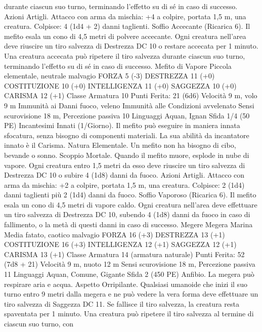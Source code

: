 \begin{multicols}{2}
durante ciascun suo turno, terminando l’effetto su di sé in caso di
successo.
Azioni
Artigli. Attacco con arma da mischia: +4 a colpire, portata 1,5
m, una creatura.
Colpisce: 4 (1d4 + 2) danni taglienti.
Soffio Accecante (Ricarica 6). Il mefito esala un cono di 4,5
metri di polvere accecante. Ogni creatura nell’area deve riuscire
un tiro salvezza di Destrezza DC 10 o restare accecata per 1
minuto. Una creatura accecata può ripetere il tiro salvezza
durante ciascun suo turno, terminando l’effetto su di sé in caso di
successo.
Mefito di Vapore
Piccola elementale, neutrale malvagio
FORZA 5 (-3)
DESTREZZA 11 (+0)
COSTITUZIONE 10 (+0)
INTELLIGENZA 11 (+0)
SAGGEZZA 10 (+0)
CARISMA 12 (+1)
Classe Armatura 10
\hspace*{0pt}\hfill{Punti Ferita}: 21 (6d6)
Velocità 9 m, volo 9 m
Immunità ai Danni fuoco, veleno
Immunità alle Condizioni avvelenato
Sensi scurovisione 18 m, Percezione passiva 10
Linguaggi Aquan, Ignan
Sfida 1/4 (50 PE)
Incantesimi Innati (1/Giorno). Il mefito può eseguire in maniera
innata sfocatura, senza bisogno di componenti materiali. La sua
abilità da incantatore innato è il Carisma.
Natura Elementale. Un mefito non ha bisogno di cibo, bevande
o sonno.
Scoppio Mortale. Quando il mefito muore, esplode in nube di
vapore. Ogni creatura entro 1,5 metri da esso deve riuscire un
tiro salvezza di Destrezza DC 10 o subire 4 (1d8) danni da fuoco.
Azioni
Artigli. Attacco con arma da mischia: +2 a colpire, portata 1,5
m, una creatura.
Colpisce: 2 (1d4) danni taglienti più 2 (1d4) danni da fuoco.
Soffio Vaporoso (Ricarica 6). Il mefito esala un cono di 4,5
metri di vapore caldo. Ogni creatura nell’area deve effettuare un
tiro salvezza di Destrezza DC 10, subendo 4 (1d8) danni da
fuoco in caso di fallimento, o la metà di questi danni in caso di
successo.
Megere
Megera Marina
Media fatato, caotico malvagio
FORZA 16 (+3)
DESTREZZA 13 (+1)
COSTITUZIONE 16 (+3)
INTELLIGENZA 12 (+1)
SAGGEZZA 12 (+1)
CARISMA 13 (+1)
Classe Armatura 14 (armatura naturale)
\hspace*{0pt}\hfill{Punti Ferita}: 52 (7d8 + 21)
Velocità 9 m, nuoto 12 m
Sensi scurovisione 18 m, Percezione passiva 11
Linguaggi Aquan, Comune, Gigante
Sfida 2 (450 PE)
Anfibio. La megera può respirare aria e acqua.
Aspetto Orripilante. Qualsiasi umanoide che inizi il suo turno
entro 9 metri dalla megera e ne può vedere la vera forma deve
effettuare un tiro salvezza di Saggezza DC 11. Se fallisce il tiro
salvezza, la creatura resta spaventata per 1 minuto. Una creatura
può ripetere il tiro salvezza al termine di ciascun suo turno, con

\end{multicols}
